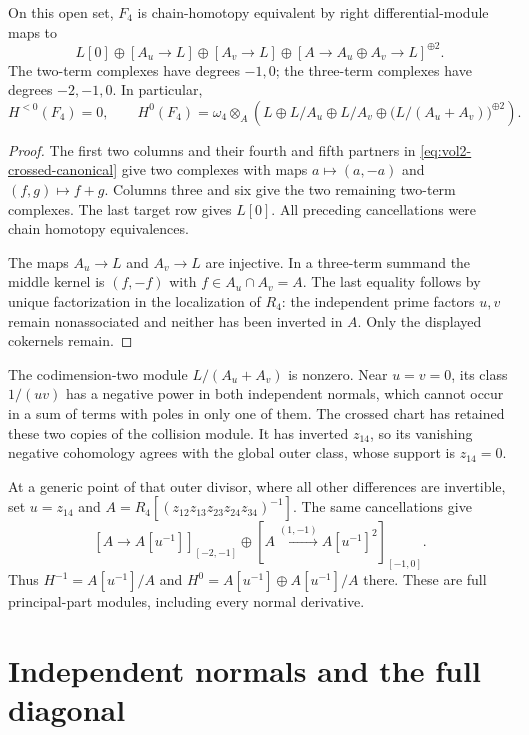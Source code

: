 \begin{theorem}
\label{thm:vol2-crossed-collision}
On this open set, $F_4$ is chain-homotopy equivalent by right
differential-module maps to
\begin{equation}\label{eq:vol2-crossed-splitting}
 L[0]\oplus[A_u\to L]\oplus[A_v\to L]
       \oplus[A\to A_u\oplus A_v\to L]^{\oplus2}.
\end{equation}
The two-term complexes have degrees $-1,0$; the three-term
complexes have degrees $-2,-1,0$. In particular,
\[
 H^{<0}(F_4)=0,\qquad
 H^0(F_4)=\omega_4\otimes_A
 \left(L\oplus L/A_u\oplus L/A_v
              \oplus\bigl(L/(A_u+A_v)\bigr)^{\oplus2}\right).
\]
\end{theorem}

\begin{proof}
The first two columns and their fourth and fifth partners
in \eqref{eq:vol2-crossed-canonical} give two complexes with
maps $a\mapsto(a,-a)$ and $(f,g)\mapsto f+g$.
Columns three and six give the two remaining two-term
complexes. The last target row gives $L[0]$.
All preceding cancellations were chain homotopy equivalences.

The maps $A_u\to L$ and $A_v\to L$ are injective. In a
three-term summand the middle kernel is $(f,-f)$ with
$f\in A_u\cap A_v=A$. The last equality follows by unique
factorization in the localization of $R_4$: the independent
prime factors $u,v$ remain nonassociated and neither has been
inverted in $A$. Only the displayed cokernels remain.
\end{proof}

The codimension-two module $L/(A_u+A_v)$ is nonzero. Near
$u=v=0$, its class $1/(uv)$ has a negative power in both
independent normals, which cannot occur in a sum of terms
with poles in only one of them. The crossed chart has retained
these two copies of the collision module. It has inverted
$z_{14}$, so its vanishing negative cohomology agrees with the
global outer class, whose support is $z_{14}=0$.

At a generic point of that outer divisor, where all other
differences are invertible, set
$u=z_{14}$ and $A=R_4[(z_{12}z_{13}z_{23}z_{24}z_{34})^{-1}]$.
The same cancellations give
\[
 [A\to A[u^{-1}]]_{[-2,-1]}
 \oplus[A\xrightarrow{(1,-1)}A[u^{-1}]^2]_{[-1,0]}.
\]
Thus $H^{-1}=A[u^{-1}]/A$ and
$H^0=A[u^{-1}]\oplus A[u^{-1}]/A$ there. These are full
principal-part modules, including every normal derivative.

\section{Independent normals and the full diagonal}
\label{sec:vol2-full-diagonal-support}

